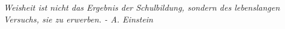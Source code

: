 \begin{center}
    \textit{Weisheit ist nicht das Ergebnis der Schulbildung, sondern des lebenslangen Versuchs, sie zu erwerben. - A. Einstein}
\end{center}
    
    